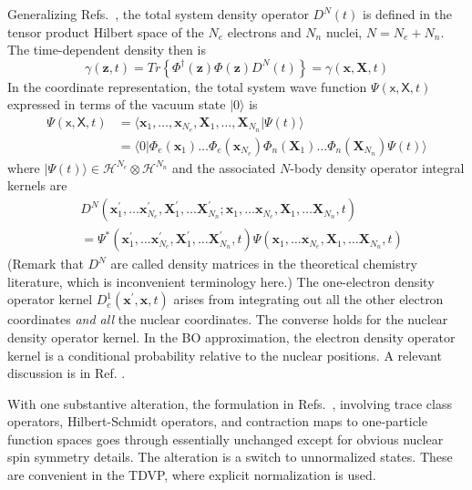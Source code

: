 \documentclass[aps,preprint]{revtex4}%
\begin{document}
Generalizing Refs.~\cite{BLWSBT99a,BLWSBT00a}, the total system density
operator $D^{N}(t)$ is defined in the tensor product Hilbert space of the
$N_{e}$ electrons and $N_{n}$ nuclei, $N=N_{e}+N_{n}$. The time-dependent
density then is
\begin{equation}
\gamma(\mathbf{z},t)=Tr\left\{  \Phi^{\dagger}(\mathbf{z})\Phi(\mathbf{z}%
)D^{N}(t)\right\}  =\gamma(\mathbf{x},\mathbf{X},t)
\end{equation}
In the coordinate representation, the total system wave function
$\Psi(\mathsf{x},\mathsf{X},t)$ expressed in terms of the vacuum state
$|0\rangle$ is
\begin{align}
\Psi(\mathsf{x},\mathsf{X},t)  &  =\langle\mathbf{x}_{1},\ldots,\mathbf{x}%
_{N_{e}},\mathbf{X}_{1},\ldots,\mathbf{X}_{N_{n}}|\Psi(t)\rangle\nonumber\\
&  =\langle0|\Phi_{e}(\mathbf{x}_{1})\ldots\Phi_{e}(\mathbf{x}_{N_{e}}%
)\Phi_{n}(\mathbf{X}_{1})\ldots\Phi_{n}(\mathbf{X}_{N_{n}})\Psi(t)\rangle
\end{align}
where $|\Psi(t)\rangle\in\mathcal{H}^{N_{e}}\otimes\mathcal{H}^{N_{n}}$ and
the associated $N$-body density operator integral kernels are
\begin{align}
&  D^{N}(\mathbf{x}_{1}^{\prime},\ldots\mathbf{x}_{N_{e}}^{\prime}%
,\mathbf{X}_{1}^{\prime},\ldots\mathbf{X}_{N_{n}}^{\prime};\mathbf{x}%
_{1},\ldots\mathbf{x}_{N_{e}},\mathbf{X}_{1},\ldots\mathbf{X}_{N_{n}%
},t)\nonumber\\
&  =\Psi^{\ast}(\mathbf{x}_{1}^{\prime},\ldots\mathbf{x}_{N_{e}}^{\prime
},\mathbf{X}_{1}^{\prime},\ldots\mathbf{X}_{N_{n}}^{\prime},t)\Psi
(\mathbf{x}_{1},\ldots\mathbf{x}_{N_{e}},\mathbf{X}_{1},\ldots\mathbf{X}%
_{N_{n}},t)
\end{align}
(Remark that $D^{N}$ are called density matrices in the theoretical chemistry
literature, which is inconvenient terminology here.) The one-electron density
operator kernel $D_{e}^{1}(\mathbf{x}^{\prime},\mathbf{x},t)$ arises from
integrating out all the other electron coordinates \emph{and all} the nuclear
coordinates. The converse holds for the nuclear density operator kernel. In
the BO approximation, the electron density operator kernel is a conditional
probability relative to the nuclear positions. A relevant discussion is in
Ref. \cite{Sjoqvist}.

With one substantive alteration, the formulation in
Refs.~\cite{BLWSBT99a,BLWSBT00a}, involving trace class operators,
Hilbert-Schmidt operators, and contraction maps to one-particle function
spaces goes through essentially unchanged except for obvious nuclear spin
symmetry details. The alteration is a switch to unnormalized states. These are
convenient in the TDVP, where explicit normalization is used.
\end{document}

